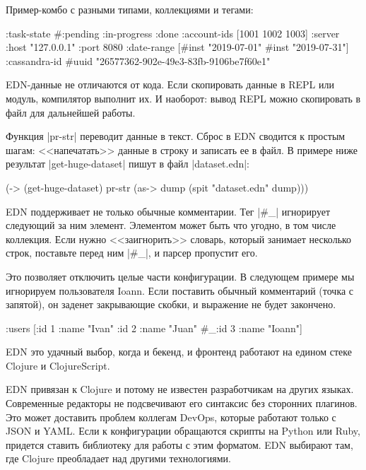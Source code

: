Пример-комбо с разными типами, коллекциями и тегами:

\begin{english}
  \begin{clojure}
{:task-state #{:pending :in-progress :done}
 :account-ids [1001 1002 1003]
 :server {:host "127.0.0.1" :port 8080}
 :date-range [#inst "2019-07-01" #inst "2019-07-31"]
 :cassandra-id #uuid "26577362-902e-49e3-83fb-9106be7f60e1"}
  \end{clojure}
\end{english}

EDN-данные не отличаются от кода. Если скопировать данные в REPL или модуль,
компилятор выполнит их. И наоборот: вывод REPL можно скопировать в файл для
дальнейшей работы.

Функция \spverb|pr-str| переводит данные в текст. Сброс в EDN сводится к простым
шагам: <<напечатать>> данные в строку и записать ее в файл. В примере ниже
результат \spverb|get-huge-dataset| пишут в файл \spverb|dataset.edn|:

\begin{english}
  \begin{clojure}
(-> (get-huge-dataset)
    pr-str
    (as-> dump
        (spit "dataset.edn" dump)))
  \end{clojure}
\end{english}

EDN поддерживает не только обычные комментарии. Тег \spverb|#_| игнорирует
следующий за ним элемент. Элементом может быть что угодно, в том числе
коллекция. Если нужно <<заигнорить>> словарь, который занимает несколько строк,
поставьте перед ним \spverb|#_|, и парсер пропустит его.

Это позволяет отключить целые части конфигурации. В следующем примере мы
игнорируем пользователя Ioann. Если поставить обычный комментарий (точка с
запятой), он заденет закрывающие скобки, и выражение не будет закончено.

\begin{english}
  \begin{clojure}
{:users [{:id 1 :name "Ivan"}
         {:id 2 :name "Juan"}
         #_{:id 3 :name "Ioann"}]}
  \end{clojure}
\end{english}

EDN это удачный выбор, когда и бекенд, и фронтенд работают на едином стеке
Clojure и ClojureScript.

EDN привязан к Clojure и потому не известен разработчикам на других
языках. Современные редакторы не подсвечивают его синтаксис без сторонних
плагинов. Это может доставить проблем коллегам DevOps, которые работают только с
JSON и YAML. Если к конфигурации обращаются скрипты на Python или Ruby, придется
ставить библиотеку для работы с этим форматом. EDN выбирают там, где Clojure
преобладает над другими технологиями.

